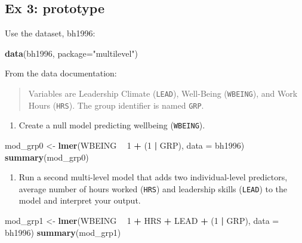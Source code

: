 \documentclass[
]{book}
\newenvironment{Shaded}{\begin{snugshade}}{\end{snugshade}}
\newcommand{\DataTypeTok}[1]{\textcolor[rgb]{0.13,0.29,0.53}{#1}}
\newcommand{\DecValTok}[1]{\textcolor[rgb]{0.00,0.00,0.81}{#1}}
\newcommand{\KeywordTok}[1]{\textcolor[rgb]{0.13,0.29,0.53}{\textbf{#1}}}
\newcommand{\NormalTok}[1]{#1}
\newcommand{\OperatorTok}[1]{\textcolor[rgb]{0.81,0.36,0.00}{\textbf{#1}}}
\newcommand{\StringTok}[1]{\textcolor[rgb]{0.31,0.60,0.02}{#1}}
\providecommand{\tightlist}{%
  \setlength{\itemsep}{0pt}\setlength{\parskip}{0pt}}
\begin{document}
\hypertarget{ex-3-prototype-1}{%
\subsection{Ex 3: prototype}\label{ex-3-prototype-1}}

Use the dataset, bh1996:

\begin{Shaded}
\begin{Highlighting}[]
  \KeywordTok{data}\NormalTok{(bh1996, }\DataTypeTok{package=}\StringTok{"multilevel"}\NormalTok{)}
\end{Highlighting}
\end{Shaded}

From the data documentation:

\begin{quote}
Variables are Leadership Climate (\texttt{LEAD}), Well-Being (\texttt{WBEING}), and Work Hours (\texttt{HRS}). The group identifier is named \texttt{GRP}.
\end{quote}

\begin{enumerate}
\def\labelenumi{\arabic{enumi}.}
\tightlist
\item
  Create a null model predicting wellbeing (\texttt{WBEING}).
\end{enumerate}

\begin{Shaded}
\begin{Highlighting}[]
\NormalTok{  mod_grp0 <-}\StringTok{ }\KeywordTok{lmer}\NormalTok{(WBEING }\OperatorTok{~}\StringTok{ }\DecValTok{1} \OperatorTok{+}\StringTok{ }\NormalTok{(}\DecValTok{1} \OperatorTok{|}\StringTok{ }\NormalTok{GRP), }\DataTypeTok{data =}\NormalTok{ bh1996)}
  \KeywordTok{summary}\NormalTok{(mod_grp0)}
\end{Highlighting}
\end{Shaded}

\begin{enumerate}
\def\labelenumi{\arabic{enumi}.}
\setcounter{enumi}{2}
\tightlist
\item
  Run a second multi-level model that adds two individual-level predictors, average number of hours worked (\texttt{HRS}) and leadership skills (\texttt{LEAD}) to the model and interpret your output.
\end{enumerate}

\begin{Shaded}
\begin{Highlighting}[]
\NormalTok{  mod_grp1 <-}\StringTok{ }\KeywordTok{lmer}\NormalTok{(WBEING }\OperatorTok{~}\StringTok{ }\DecValTok{1} \OperatorTok{+}\StringTok{ }\NormalTok{HRS }\OperatorTok{+}\StringTok{ }\NormalTok{LEAD }\OperatorTok{+}\StringTok{ }\NormalTok{(}\DecValTok{1} \OperatorTok{|}\StringTok{ }\NormalTok{GRP), }\DataTypeTok{data =}\NormalTok{ bh1996)}
  \KeywordTok{summary}\NormalTok{(mod_grp1)}
\end{Highlighting}
\end{Shaded}
\end{document}
